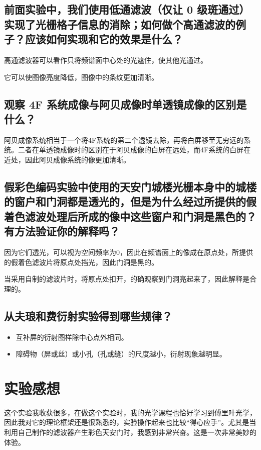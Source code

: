 \documentclass[11pt]{article}
\begin{document}
	\subsection{前面实验中，我们使用低通滤波（仅让 0 级斑通过）实现了光栅格子信息的消除；如何做个高通滤波的例子？应该如何实现和它的效果是什么？}
	高通滤波器可以看作只将频谱面中心处的光遮住，使其他光通过。
	
	它可以使图像亮度降低，图像中的条纹更加清晰。
	
	\subsection{观察 4F 系统成像与阿贝成像时单透镜成像的区别是什么？}
	阿贝成像系统相当于一个将4F系统的第二个透镜去除，再将白屏移至无穷远的系统。二者在单透镜成像时的区别在于阿贝成像的白屏在远处，而4F系统的白屏在近处，因此阿贝成像系统的像更加清晰。
	
	\subsection{假彩色编码实验中使用的天安门城楼光栅本身中的城楼的窗户和门洞都是透光的，但是为什么经过所提供的假着色滤波处理后所成的像中这些窗户和门洞是黑色的？有方法验证你的解释吗？}
	因为它们透光，可以视为空间频率为0，因此在频谱面上的像成在原点处，所提供的假着色滤波片将原点处挡光，因此门洞是黑的。
	
	当采用自制的滤波片时，将原点处扣开，的确观察到门洞亮起来了，因此解释是合理的。
	
	\subsection{从夫琅和费衍射实验得到哪些规律？}
	\begin{itemize}
		\item 互补屏的衍射图样除中心点外相同。
		\item 障碍物（屏或丝）或小孔（孔或缝）的尺度越小，衍射现象越明显。
	\end{itemize}
	
	\section{实验感想}
	这个实验我收获很多，在做这个实验时，我的光学课程也恰好学习到傅里叶光学，因此我对它的理论框架还是很熟悉的，实验操作起来也比较“得心应手”。尤其是当利用自己制作的滤波器产生彩色天安门时，我感到非常兴奋。这是一次非常美妙的体验。
	
	
	
	
	
	
\end{document}
